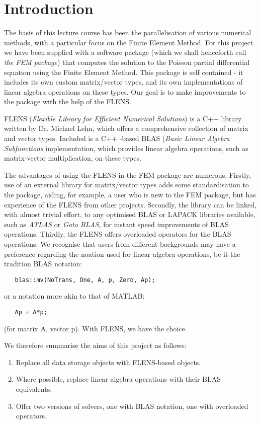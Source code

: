 
\section{Introduction}

The basis of this lecture course has been the parallelisation of various numerical methods, with a particular focus on the Finite Element Method. For this project we have been supplied with a software package (which we shall henceforth call \emph{the FEM package}) that computes the solution to the Poisson partial differential equation using the Finite Element Method. This package is self contained - it includes its own custom matrix/vector types, and its own implementations of linear algebra operations on these types. Our goal is to make improvements to the package with the help of the FLENS.

FLENS (\emph{Flexible Library for Efficient Numerical Solutions}) is a C++ library written by Dr. Michael Lehn, which offers a comprehensive collection of matrix and vector types. Included is a C++ -based BLAS (\emph{Basic Linear Algebra Subfunctions} implementation, which provides linear algebra operations, such as matrix-vector multiplication, on these types. 

The advantages of using the FLENS in the FEM package are numerous. Firstly, use of an external library for matrix/vector types adds some standardisation to the package, aiding, for example, a user who is new to the FEM package, but has experience of the FLENS from other projects. Secondly, the library can be linked, with almost trivial effort, to any optimised BLAS or LAPACK libraries available, such as \emph{ATLAS} or \emph{Goto BLAS}, for instant speed improvements of BLAS operations. Thirdly, the FLENS offers overloaded operators for the BLAS operations. We recognise that users from different backgrounds may have a preference regarding the noation used for linear algebra operations, be it the tradition BLAS notation:
\begin{lstlisting}
   blas::mv(NoTrans, One, A, p, Zero, Ap);
\end{lstlisting}
or a notation more akin to that of MATLAB:
\begin{lstlisting}
   Ap = A*p;
\end{lstlisting}
(for matrix A, vector p). With FLENS, we have the choice.

We therefore summarise the aims of this project as follows:
\begin{enumerate}
   \item Replace all data storage objects with FLENS-based objects.
   \item Where possible, replace linear algebra operations with their BLAS equivalents.
   \item Offer two versions of solvers, one with BLAS notation, one with overloaded operators.
\end{enumerate}

